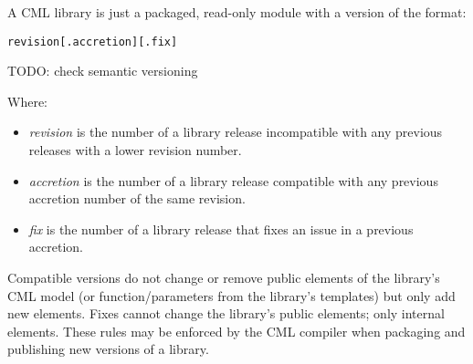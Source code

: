 A CML library is just a packaged, read-only module with a version of the format: 

\verbatimfont{\small}
\begin{verbatim}
revision[.accretion][.fix]
\end{verbatim}

TODO: check semantic versioning

Where:
\begin{itemize}
\item \emph{revision} is the number of a library release incompatible with any previous releases with a lower revision number.
\item \emph{accretion} is the number of a library release compatible with any previous accretion number of the same revision.
\item \emph{fix} is the number of a library release that fixes an issue in a previous accretion.
\end{itemize}

Compatible versions do not change or remove public elements of the library's CML model (or function/parameters from the library's templates) but only add new elements. Fixes cannot change the library's public elements; only internal elements. These rules may be enforced by the CML compiler when packaging and publishing new versions of a library.
